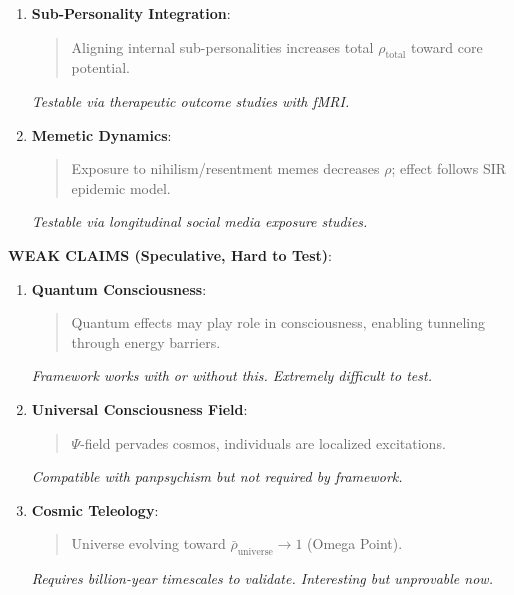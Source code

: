 \documentclass[11pt,a4paper]{article}
\theoremstyle{definition}
\theoremstyle{remark}
\begin{document}
\begin{small}
\begin{enumerate}
\begin{protocol}
\begin{mdframed}[backgroundcolor=yellow!10,linewidth=2pt]
\begin{enumerate}
    \item \textbf{Sub-Personality Integration}:
        \begin{quote}
        Aligning internal sub-personalities increases total \(\rho_{\text{total}}\) toward core potential.
        \end{quote}
        \textit{Testable via therapeutic outcome studies with fMRI.}
    
    \item \textbf{Memetic Dynamics}:
        \begin{quote}
        Exposure to nihilism/resentment memes decreases \(\rho\); effect follows SIR epidemic model.
        \end{quote}
        \textit{Testable via longitudinal social media exposure studies.}
\end{enumerate}

\textbf{WEAK CLAIMS (Speculative, Hard to Test)}:

\begin{enumerate}
    \item \textbf{Quantum Consciousness}:
        \begin{quote}
        Quantum effects may play role in consciousness, enabling tunneling through energy barriers.
        \end{quote}
        \textit{Framework works with or without this. Extremely difficult to test.}
    
    \item \textbf{Universal Consciousness Field}:
        \begin{quote}
        \(\Psi\)-field pervades cosmos, individuals are localized excitations.
        \end{quote}
        \textit{Compatible with panpsychism but not required by framework.}
    
    \item \textbf{Cosmic Teleology}:
        \begin{quote}
        Universe evolving toward \(\bar{\rho}_{\text{universe}} \to 1\) (Omega Point).
        \end{quote}
        \textit{Requires billion-year timescales to validate. Interesting but unprovable now.}
\end{enumerate}


\end{mdframed}
\end{protocol}
\end{enumerate}
\end{small}
\end{document}
